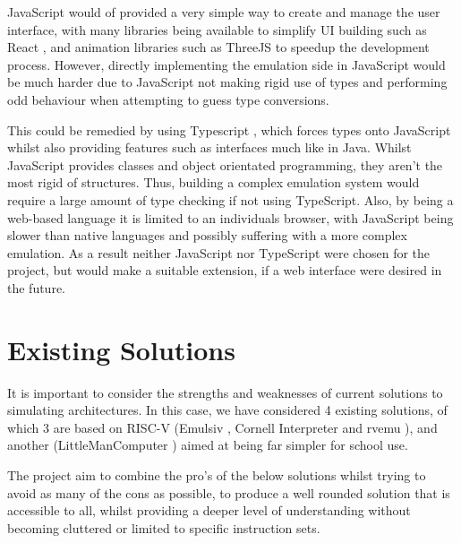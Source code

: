 JavaScript would of provided a very simple way to create and manage the user interface, with many libraries being available to simplify \ac{UI} building such as React \cite{metaopensource_2023_react}, and animation libraries such as ThreeJS \cite{cabello_2023_threejs} to speedup the development process. However, directly implementing the emulation side in JavaScript would be much harder due to JavaScript not making rigid use of types and performing odd behaviour when attempting to guess type conversions.

This could be remedied by using Typescript \cite{microsoftcorporation_2020_javascript}, which forces types onto JavaScript whilst also providing features such as interfaces much like in Java. Whilst JavaScript provides classes and object orientated programming, they aren't the most rigid of structures. Thus, building a complex emulation system would require a large amount of type checking if not using TypeScript. Also, by being a web-based language it is limited to an individuals browser, with JavaScript being slower than native languages and possibly suffering with a more complex emulation. As a result neither JavaScript nor TypeScript were  chosen for the project, but would make a suitable extension, if a web interface were desired in the future.

\section{Existing Solutions}

It is important to consider the strengths and weaknesses of current solutions to simulating architectures. In this case, we have considered 4 existing solutions, of which 3 are based on RISC-V (Emulsiv \cite{savaton_2023_eseotechemulsiv}, Cornell Interpreter \cite{cornelluniversity_riscv} and rvemu \cite{doi_2021_d0iasmrvemu}), and another (LittleManComputer \cite{higginson_2014_little}) aimed at being far simpler for school use.

The project aim to combine the pro's of the below solutions whilst trying to avoid as many of the cons as possible, to produce a well rounded solution that is accessible to all, whilst providing a deeper level of understanding without becoming cluttered or limited to specific instruction sets.

